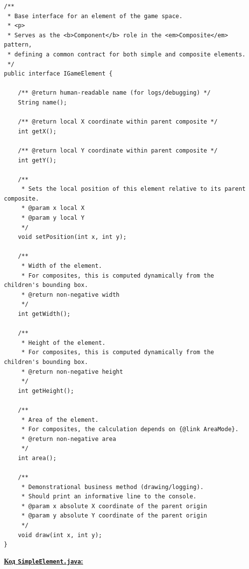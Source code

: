 \documentclass[12pt,a4paper]{article}
\begin{document}
    \begin{verbatim}
/**
 * Base interface for an element of the game space.
 * <p>
 * Serves as the <b>Component</b> role in the <em>Composite</em> pattern,
 * defining a common contract for both simple and composite elements.
 */
public interface IGameElement {

    /** @return human-readable name (for logs/debugging) */
    String name();

    /** @return local X coordinate within parent composite */
    int getX();

    /** @return local Y coordinate within parent composite */
    int getY();

    /**
     * Sets the local position of this element relative to its parent composite.
     * @param x local X
     * @param y local Y
     */
    void setPosition(int x, int y);

    /**
     * Width of the element.
     * For composites, this is computed dynamically from the children's bounding box.
     * @return non-negative width
     */
    int getWidth();

    /**
     * Height of the element.
     * For composites, this is computed dynamically from the children's bounding box.
     * @return non-negative height
     */
    int getHeight();

    /**
     * Area of the element.
     * For composites, the calculation depends on {@link AreaMode}.
     * @return non-negative area
     */
    int area();

    /**
     * Demonstrational business method (drawing/logging).
     * Should print an informative line to the console.
     * @param x absolute X coordinate of the parent origin
     * @param y absolute Y coordinate of the parent origin
     */
    void draw(int x, int y);
}
    \end{verbatim}

    \textbf{\underline{Код \texttt{SimpleElement.java}:}}
\end{document}
